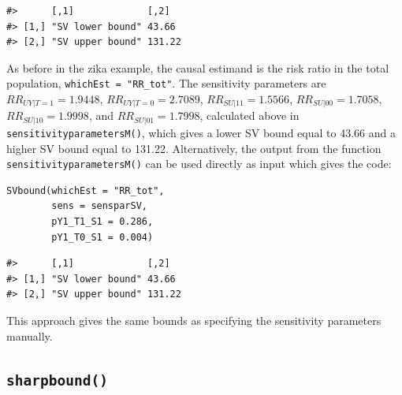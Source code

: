 \begin{verbatim}
#>      [,1]             [,2]  
#> [1,] "SV lower bound" 43.66 
#> [2,] "SV upper bound" 131.22
\end{verbatim}

As before in the zika example, the causal estimand is the risk ratio in the
total population, \texttt{whichEst\ =\ "RR\_tot"}. The sensitivity parameters are
\(RR_{UY|T=1}=1.9448\), \(RR_{UY|T=0}=2.7089\), \(RR_{SU|11}=1.5566\),
\(RR_{SU|00}=1.7058\), \(RR_{SU|10}=1.9998\), and \(RR_{SU|01}=1.7998\), calculated
above in \texttt{sensitivityparametersM()}, which gives a lower SV bound equal to 43.66
and a higher SV bound equal to 131.22. Alternatively, the output from the function
\texttt{sensitivityparametersM()} can be used directly as input which gives the code:

\begin{verbatim}
SVbound(whichEst = "RR_tot",
        sens = sensparSV,
        pY1_T1_S1 = 0.286,
        pY1_T0_S1 = 0.004)
\end{verbatim}

\begin{verbatim}
#>      [,1]             [,2]  
#> [1,] "SV lower bound" 43.66 
#> [2,] "SV upper bound" 131.22
\end{verbatim}

This approach gives the same bounds as specifying the sensitivity parameters
manually.

\subsection{\texorpdfstring{\texttt{sharpbound()}}{sharpbound()}}\label{sharpbound}

